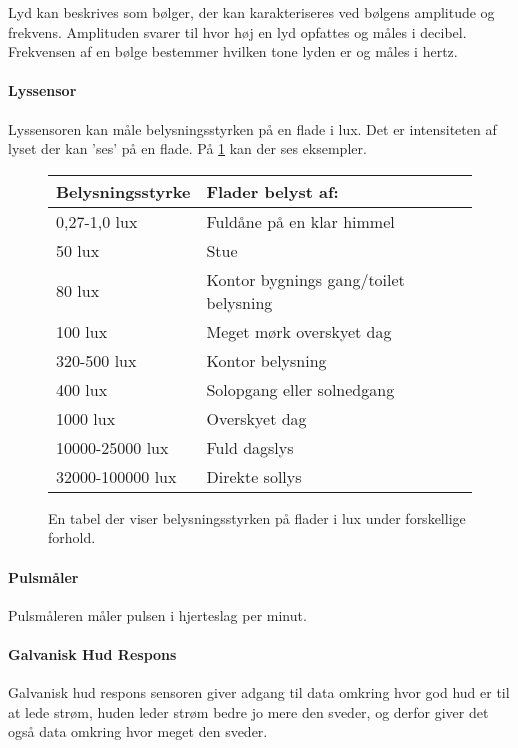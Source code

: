 Lyd kan beskrives som bølger, der kan karakteriseres ved bølgens amplitude og frekvens.
Amplituden svarer til hvor høj en lyd opfattes og måles i decibel.
Frekvensen af en bølge bestemmer hvilken tone lyden er og måles i hertz. \cite{sound}


\paragraph{Lyssensor}
Lyssensoren kan måle belysningsstyrken på en flade i lux. Det er intensiteten af lyset der kan 'ses' på en flade. På \cref{fig:lux}  kan der ses eksempler.

\begin{figure}
	\centering
\begin{tabular}{ l | l}
	\textbf{Belysningsstyrke} & \textbf{Flader belyst af: }\\
\hline
0,27-1,0 lux &  Fuldåne på en klar himmel \\
\hline
50 lux & Stue \\
\hline
80 lux & Kontor bygnings gang/toilet belysning \\
\hline
100 lux & Meget mørk overskyet dag \\
\hline
320-500 lux & Kontor belysning \\
\hline
400 lux & Solopgang eller solnedgang \\
\hline
1000 lux & Overskyet dag \\
\hline
10000-25000 lux & Fuld dagslys \\
\hline
32000-100000 lux & Direkte sollys\\
\hline
\end{tabular}
\caption{En tabel der viser belysningsstyrken på flader i lux under forskellige forhold. \citep{misc:lux}}
\label{fig:lux}
\end{figure}

\paragraph{Pulsmåler}
Pulsmåleren måler pulsen i hjerteslag per minut.

\paragraph{Galvanisk Hud Respons}
Galvanisk hud respons sensoren giver adgang til data omkring hvor god hud er til at lede strøm, huden leder strøm bedre jo mere den sveder, og derfor giver det også data omkring hvor meget den sveder.